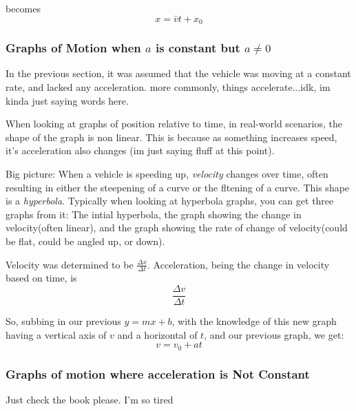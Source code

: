 \documentclass{article}
\begin{document}
becomes
\[x = \bar{v}t + x_0\]

\subsubsection{Graphs of Motion when $a$ is constant but $a \neq 0$}

In the previous section, it was assumed that the vehicle was moving at a constant rate, and lacked any acceleration. more commonly, things accelerate...idk, im kinda just saying words here.

When looking at graphs of position relative to time, in real-world scenarios, the shape of the graph is non linear. This is because as something increases speed, it's acceleration also changes (im just saying fluff at this point).

Big picture: When a vehicle is speeding up, \emph{velocity} changes over time, often resulting in either the steepening of a curve or the fltening of a curve. This shape is a \emph{hyperbola}.
Typically when looking at hyperbola graphs, you can get three graphs from it: The intial hyperbola, the graph showing the change in velocity(often linear), and the graph showing the rate of change of velocity(could be flat, could be angled up, or down).

Velocity was determined to be $\frac{\Delta{x}}{\Delta{t}}$.
Acceleration, being the change in velocity based on time, is \[\frac{\Delta{v}}{\Delta{t}}\]

So, subbing in our previous $y=mx+b$, with the knowledge of this new graph having a vertical axis of $v$ and a horizontal of $t$, and our previous graph, we get:
\[v=v_0 + at\]

\subsubsection{Graphs of motion where acceleration is Not Constant}

Just check the book please. I'm so tired

  
\end{document}
